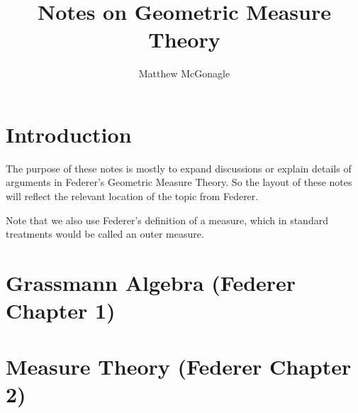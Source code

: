\documentclass{article}
\begin{document}
\title{Notes on Geometric Measure Theory}
\author{Matthew McGonagle}
\maketitle
\section{Introduction}
The purpose of these notes is mostly to expand discussions or explain details of arguments
in Federer's Geometric Measure Theory. So the layout of these notes will reflect the relevant location
of the topic from Federer.

Note that we also use Federer's definition of a measure, which in standard treatments would be called
an outer measure.

\section{Grassmann Algebra (Federer Chapter 1)}


\section{Measure Theory (Federer Chapter 2)}



\end{document}
